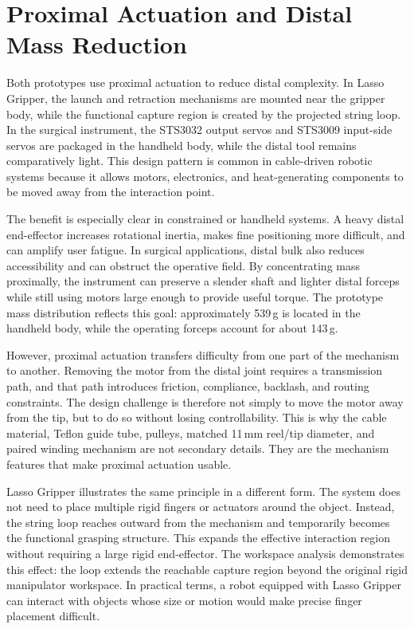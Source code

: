 \section{Proximal Actuation and Distal Mass Reduction}

Both prototypes use proximal actuation to reduce distal complexity. In Lasso Gripper, the launch and retraction mechanisms are mounted near the gripper body, while the functional capture region is created by the projected string loop. In the surgical instrument, the STS3032 output servos and STS3009 input-side servos are packaged in the handheld body, while the distal tool remains comparatively light. This design pattern is common in cable-driven robotic systems because it allows motors, electronics, and heat-generating components to be moved away from the interaction point.

The benefit is especially clear in constrained or handheld systems. A heavy distal end-effector increases rotational inertia, makes fine positioning more difficult, and can amplify user fatigue. In surgical applications, distal bulk also reduces accessibility and can obstruct the operative field. By concentrating mass proximally, the instrument can preserve a slender shaft and lighter distal forceps while still using motors large enough to provide useful torque. The prototype mass distribution reflects this goal: approximately 539\,g is located in the handheld body, while the operating forceps account for about 143\,g.

However, proximal actuation transfers difficulty from one part of the mechanism to another. Removing the motor from the distal joint requires a transmission path, and that path introduces friction, compliance, backlash, and routing constraints. The design challenge is therefore not simply to move the motor away from the tip, but to do so without losing controllability. This is why the cable material, Teflon guide tube, pulleys, matched 11\,mm reel/tip diameter, and paired winding mechanism are not secondary details. They are the mechanism features that make proximal actuation usable.

Lasso Gripper illustrates the same principle in a different form. The system does not need to place multiple rigid fingers or actuators around the object. Instead, the string loop reaches outward from the mechanism and temporarily becomes the functional grasping structure. This expands the effective interaction region without requiring a large rigid end-effector. The workspace analysis demonstrates this effect: the loop extends the reachable capture region beyond the original rigid manipulator workspace. In practical terms, a robot equipped with Lasso Gripper can interact with objects whose size or motion would make precise finger placement difficult.

